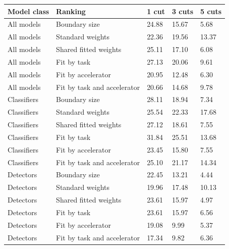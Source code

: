 \begin{tabular}{@{}lllll@{}}
\toprule
Model class & Ranking & 1 cut & 3 cuts & 5 cuts \\
\midrule
All models & Boundary size & 24.88 & 15.67 & 5.68 \\
All models & Standard weights & 22.36 & 19.56 & 13.37 \\
All models & Shared fitted weights & 25.11 & 17.10 & 6.08 \\
All models & Fit by task & 27.13 & 20.06 & 9.61 \\
All models & Fit by accelerator & 20.95 & 12.48 & 6.30 \\
All models & Fit by task and accelerator & 20.66 & 14.68 & 9.78 \\
Classifiers & Boundary size & 28.11 & 18.94 & 7.34 \\
Classifiers & Standard weights & 25.54 & 22.33 & 17.68 \\
Classifiers & Shared fitted weights & 27.12 & 18.61 & 7.55 \\
Classifiers & Fit by task & 31.84 & 25.51 & 13.68 \\
Classifiers & Fit by accelerator & 23.45 & 15.80 & 7.55 \\
Classifiers & Fit by task and accelerator & 25.10 & 21.17 & 14.34 \\
Detectors & Boundary size & 22.45 & 13.21 & 4.44 \\
Detectors & Standard weights & 19.96 & 17.48 & 10.13 \\
Detectors & Shared fitted weights & 23.61 & 15.97 & 4.97 \\
Detectors & Fit by task & 23.61 & 15.97 & 6.56 \\
Detectors & Fit by accelerator & 19.08 & 9.99 & 5.37 \\
Detectors & Fit by task and accelerator & 17.34 & 9.82 & 6.36 \\
\bottomrule
\end{tabular}
